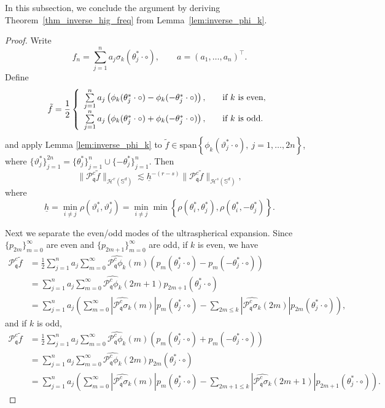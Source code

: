 \documentclass{article}
\numberwithin{equation}{section}
\def\SS{\mathbb{S}}
\def\sul{\sum\limits}
\def\rr{ r}
\def\pc{\mathcal{P}^c}
\def\mq{\mathfrak{q}}
\def\mH{\mathcal{H}^\rr(\SS^d)}
\begin{document}
In this subsection, we conclude the argument by deriving Theorem~\ref{thm_inverse_hig_freq} from Lemma~\ref{lem:inverse_phi_k}.
\begin{proof}
Write
\[
f_n=\sul_{j=1}^na_j\sigma_k(\theta_j^*\cdot\circ),\qquad a=(a_1,\dots,a_n)^\top.
\]
Define
\begin{equation}
    \tilde{f}=\frac{1}{2}\left\{\begin{array}{ll}
        \sul_{j=1}^na_j\left(\phi_k(\theta_j^*\cdot\circ)-\phi_k(-\theta_j^*\cdot\circ)\right), &\quad\hbox{if $k$ is even},  \\
        \sul_{j=1}^na_j\left(\phi_k(\theta_j^*\cdot\circ)+\phi_k(-\theta_j^*\cdot\circ)\right), &\quad\hbox{if $k$ is odd}.
    \end{array}\right.
\end{equation}
and apply Lemma \ref{lem:inverse_phi_k} to $\tilde f\in\mathrm{span}\left\{\phi_k(\vartheta_j^*\cdot\circ),~j=1,\dots,2n\right\}$, where $\{\vartheta_j^*\}_{j=1}^{2n}=\{\theta_j^*\}_{j=1}^n\cup\{-\theta_j^*\}_{j=1}^n$. Then
\begin{equation}\label{eqn:tilde_f_inverse}
    \big\|\pc_\mq\tilde f\big\|_{\mH}\lesssim \underline{h}^{-(r-s)}\big\|\pc_\mq\tilde f\big\|_{\mathcal{H}^s(\SS^d)},
\end{equation}
where
$$\underline{h}=\min\limits_{i\neq j}\rho(\vartheta_i^*,\vartheta_j^*)=\min\limits_{i\neq j}\min\left\{\rho(\theta_i^*,\theta_j^*),\rho(\theta_i^*,-\theta_j^*)\right\}.$$

Next we separate the even/odd modes of the ultraspherical expansion.
Since $\{p_{2m}\}_{m=0}^\infty$ are even and $\{p_{2m+1}\}_{m=0}^\infty$ are odd, if $k$ is even, we have
\begin{equation*}
    \begin{split}
        \pc_\mq\tilde{f}
        &=\frac{1}{2}\sul_{j=1}^na_j\sul_{m=0}^\infty\widehat{\pc_\mq\phi_k}(m)\left(p_m(\theta_j^*\cdot\circ)-p_m(-\theta_j^*\cdot\circ)\right)\\
        &=\sul_{j=1}^na_j\sul_{m=0}^\infty\widehat{\pc_\mq\phi_k}(2m+1)p_{2m+1}(\theta_j^*\cdot\circ)\\
        &=\sul_{j=1}^na_j\left(\sul_{m=0}^\infty\left|\widehat{\pc_\mq\sigma_k}(m)\right|p_m(\theta_j^*\cdot\circ)-\sul_{2m\leq k}\left|\widehat{\pc_\mq\sigma_k}(2m)\right|p_{2m}(\theta_j^*\cdot\circ)\right),
    \end{split}
\end{equation*}
and if $k$ is odd,
\begin{equation*}
    \begin{split}
        \pc_\mq\tilde{f}
        &=\frac{1}{2}\sul_{j=1}^na_j\sul_{m=0}^\infty\widehat{\pc_\mq\phi_k}(m)\left(p_m(\theta_j^*\cdot\circ)+p_m(-\theta_j^*\cdot\circ)\right)\\
        &=\sul_{j=1}^na_j\sul_{m=0}^\infty\widehat{\pc_\mq\phi_k}(2m)p_{2m}(\theta_j^*\cdot\circ)\\
        &=\sul_{j=1}^na_j\left(\sul_{m=0}^\infty\left|\widehat{\pc_\mq\sigma_k}(m)\right|p_m(\theta_j^*\cdot\circ)-\sul_{2m+1\leq k}\left|\widehat{\pc_\mq\sigma_k}(2m+1)\right|p_{2m+1}(\theta_j^*\cdot\circ)\right).
    \end{split}
\end{equation*}


\end{proof}
\end{document}
